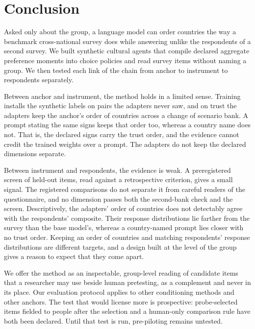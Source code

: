 \section{Conclusion}\label{sec:conclusion}

Asked only about the group, a language model can order countries the way a benchmark cross-national survey does while answering unlike the respondents of a second survey. We built synthetic cultural agents that compile declared aggregate preference moments into choice policies and read survey items without naming a group. We then tested each link of the chain from anchor to instrument to respondents separately.

Between anchor and instrument, the method holds in a limited sense. Training installs the synthetic labels on pairs the adapters never saw, and on trust the adapters keep the anchor's order of countries across a change of scenario bank. A prompt stating the same signs keeps that order too, whereas a country name does not. That is, the declared signs carry the trust order, and the evidence cannot credit the trained weights over a prompt. The adapters do not keep the declared dimensions separate.

Between instrument and respondents, the evidence is weak. A preregistered screen of held-out items, read against a retrospective criterion, gives a small signal. The registered comparisons do not separate it from careful readers of the questionnaire, and no dimension passes both the second-bank check and the screen. Descriptively, the adapters' order of countries does not detectably agree with the respondents' composite. Their response distributions lie farther from the survey than the base model's, whereas a country-named prompt lies closer with no trust order. Keeping an order of countries and matching respondents' response distributions are different targets, and a design built at the level of the group gives a reason to expect that they come apart.

We offer the method as an inspectable, group-level reading of candidate items that a researcher may use beside human pretesting, as a complement and never in its place. Our evaluation protocol applies to other conditioning methods and other anchors. The test that would license more is prospective: probe-selected items fielded to people after the selection and a human-only comparison rule have both been declared. Until that test is run, pre-piloting remains untested.
